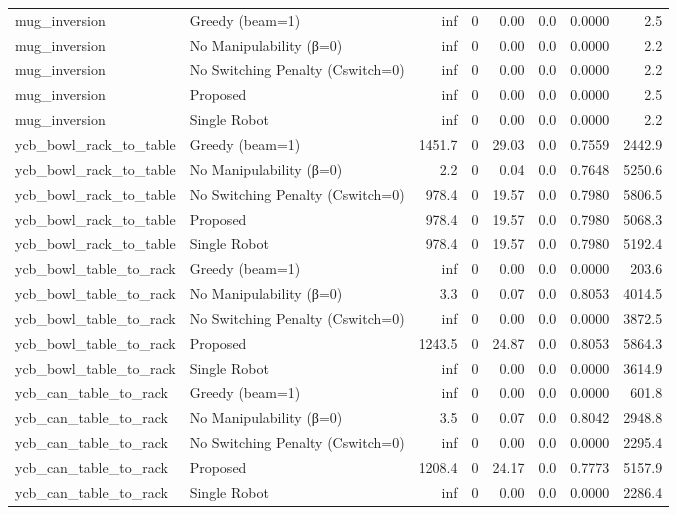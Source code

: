 \begin{table}[ht]
{\begin{tabular}{l l r r r r r r}
  mug\_inversion & Greedy (beam=1) & inf & 0 & 0.00 & 0.0 & 0.0000 & 2.5 \\
  mug\_inversion & No Manipulability (β=0) & inf & 0 & 0.00 & 0.0 & 0.0000 & 2.2 \\
  mug\_inversion & No Switching Penalty (Cswitch=0) & inf & 0 & 0.00 & 0.0 & 0.0000 & 2.2 \\
  mug\_inversion & Proposed & inf & 0 & 0.00 & 0.0 & 0.0000 & 2.5 \\
  mug\_inversion & Single Robot & inf & 0 & 0.00 & 0.0 & 0.0000 & 2.2 \\
  ycb\_bowl\_rack\_to\_table & Greedy (beam=1) & 1451.7 & 0 & 29.03 & 0.0 & 0.7559 & 2442.9 \\
  ycb\_bowl\_rack\_to\_table & No Manipulability (β=0) & 2.2 & 0 & 0.04 & 0.0 & 0.7648 & 5250.6 \\
  ycb\_bowl\_rack\_to\_table & No Switching Penalty (Cswitch=0) & 978.4 & 0 & 19.57 & 0.0 & 0.7980 & 5806.5 \\
  ycb\_bowl\_rack\_to\_table & Proposed & 978.4 & 0 & 19.57 & 0.0 & 0.7980 & 5068.3 \\
  ycb\_bowl\_rack\_to\_table & Single Robot & 978.4 & 0 & 19.57 & 0.0 & 0.7980 & 5192.4 \\
  ycb\_bowl\_table\_to\_rack & Greedy (beam=1) & inf & 0 & 0.00 & 0.0 & 0.0000 & 203.6 \\
  ycb\_bowl\_table\_to\_rack & No Manipulability (β=0) & 3.3 & 0 & 0.07 & 0.0 & 0.8053 & 4014.5 \\
  ycb\_bowl\_table\_to\_rack & No Switching Penalty (Cswitch=0) & inf & 0 & 0.00 & 0.0 & 0.0000 & 3872.5 \\
  ycb\_bowl\_table\_to\_rack & Proposed & 1243.5 & 0 & 24.87 & 0.0 & 0.8053 & 5864.3 \\
  ycb\_bowl\_table\_to\_rack & Single Robot & inf & 0 & 0.00 & 0.0 & 0.0000 & 3614.9 \\
  ycb\_can\_table\_to\_rack & Greedy (beam=1) & inf & 0 & 0.00 & 0.0 & 0.0000 & 601.8 \\
  ycb\_can\_table\_to\_rack & No Manipulability (β=0) & 3.5 & 0 & 0.07 & 0.0 & 0.8042 & 2948.8 \\
  ycb\_can\_table\_to\_rack & No Switching Penalty (Cswitch=0) & inf & 0 & 0.00 & 0.0 & 0.0000 & 2295.4 \\
  ycb\_can\_table\_to\_rack & Proposed & 1208.4 & 0 & 24.17 & 0.0 & 0.7773 & 5157.9 \\
  ycb\_can\_table\_to\_rack & Single Robot & inf & 0 & 0.00 & 0.0 & 0.0000 & 2286.4 \\

\end{tabular}}
\end{table}
